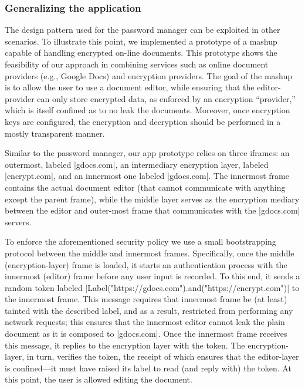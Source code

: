 \subsubsection{Generalizing the application}
The design pattern used for the password manager can be exploited in other
scenarios. To illustrate this point, we implemented a prototype of a
mashup capable of handling encrypted on-line documents.
This prototype shows the feasibility of our approach in combining
services such as online document providers (e.g., Google Docs)
and encryption providers. 
%
The goal of the mashup is to allow the user to use a document editor,
while ensuring that the editor-provider can only store encrypted data,
as enforced by an encryption ``provider,'' which is itself confined as
to no leak the documents.
%
Moreover, once encryption keys are configured, the encryption and
decryption should be performed in a mostly transparent manner.

Similar to the password manager, our app prototype relies on three
iframes: an outermost, labeled \js|gdocs.com|, an intermediary encryption
layer, labeled \js|encrypt.com|, and an innermost one labeled
\js|gdocs.com|.
The innermost frame contains the actual document editor (that cannot
communicate with anything except the parent frame), while the middle
layer serves as the encryption mediary between the editor and outer-most
frame that communicates with the \js|gdocs.com| servers.

To enforce the aforementioned security policy we use a small
bootstrapping protocol between the middle and innermost frames.
Specifically,
once the middle (encryption-layer) frame is
loaded, it starts an authentication process with the innermost
(editor) frame before any
user input is recorded. To this end, it sends a random token
labeled \js|Label("https://gdocs.com").and("https://encrypt.com")| to
the innermost frame.
This message requires that innermost frame be (at least) tainted with
the described label, and as a result, restricted from performing any network
requests; this ensures that the innermost editor cannot leak
the plain document as it is composed to \js|gdocs.com|. Once the
innermost frame receives this
message, it replies to the encryption layer with the token.
The encryption-layer, in turn, verifies the token, the receipt of which ensures
that the editor-layer is confined---it must have raised its label to
read (and reply with) the token.
At this point, the user is allowed editing the document.

